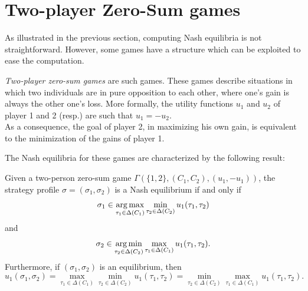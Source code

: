 %
%
%
%
%



\section{Two-player Zero-Sum games}

As illustrated in the previous section, computing Nash
 equilibria is not straightforward. However,
  some games have a structure which can be exploited
   to ease the computation.

\emph{Two-player zero-sum games} are such games.
 These games describe situations in which two individuals are
 in pure opposition to each other, where one's gain is always the
  other one's loss. More formally, the utility functions $u_1$ and $u_2$ of player 1 and 2 (resp.) are such that $u_1 = - u_2$.\\
As a consequence, the goal of player 2, in maximizing his own gain, is equivalent to the minimization of the gains of player 1.

The Nash equilibria for these games are characterized by the following result:
\begin{theorem}
Given a two-person zero-sum game $\Gamma(\{1,2\}, (C_1, C_2), (u_1, -u_1))$, the strategy profile $\sigma = (\sigma_1, \sigma_2)$ is a Nash equilibrium if and only if
$$\sigma_1 \in \operatorname*{arg\,max}_{\tau_1 \in \Delta(C_1)} \min_{\tau_2 \in \Delta(C_2)} u_1(\tau_1, \tau_2) $$
and
$$\sigma_2 \in \operatorname*{arg\,min}_{\tau_2 \in \Delta(C_2)} \max_{\tau_1 \in \Delta(C_1)} u_1(\tau_1, \tau_2). $$
Furthermore, if $(\sigma_1, \sigma_2)$ is an equilibrium, then
$$u_1(\sigma_1, \sigma_2) = \max_{\tau_1 \in \Delta(C_1)} \min_{\tau_2 \in \Delta(C_2)} u_1(\tau_1, \tau_2) = \min_{\tau_2 \in  \Delta(C_2)} \max_{\tau_1 \in \Delta(C_1)}  u_1(\tau_1, \tau_2).$$
\label{chap3:thm:2P0S}
\end{theorem}

